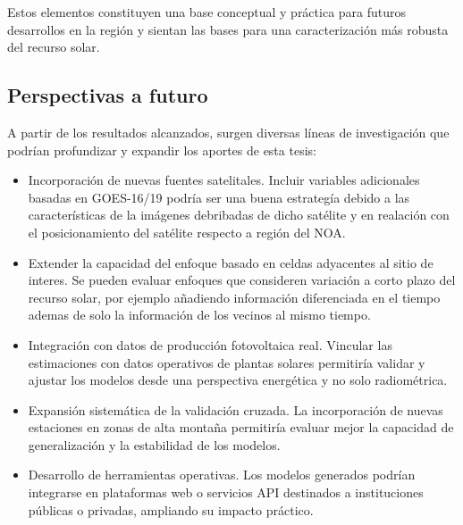 \documentclass[letterpaper,12pt, twoside]{report}
\providecommand{\DIFdeltex}[1]{{\protect\color{red} \scriptsize #1}} %
\providecommand{\DIFdel}[1]{\texorpdfstring{\DIFdeltex{#1}}{}} %
\begin{document}
\DIFdel{Estos elementos constituyen una base conceptual y práctica para futuros desarrollos en la región y sientan las bases para una caracterización más robusta del recurso solar.
}%

\subsection{\DIFdel{Perspectivas a futuro}}
\addtocounter{subsection}{-1}%

\DIFdel{A partir de los resultados alcanzados, surgen diversas líneas de investigación que podrían profundizar y expandir los aportes de esta tesis:
}%

\begin{itemize}%

\item%
\DIFdel{Incorporación de nuevas fuentes satelitales. Incluir variables adicionales basadas en  GOES-16/19 podría ser una buena estrategía debido a las características de la imágenes debribadas de dicho satélite y en realación con el posicionamiento del satélite respecto a región del NOA.
}%

\item%
\DIFdel{Extender la capacidad del enfoque basado en celdas adyacentes al sitio de interes. Se pueden evaluar enfoques que consideren variación a corto plazo del recurso solar, por ejemplo añadiendo información diferenciada en el tiempo ademas de solo la información de los vecinos al mismo tiempo.
}%

\item%
\DIFdel{Integración con datos de producción fotovoltaica real.   Vincular las estimaciones con datos operativos de plantas solares permitiría validar y ajustar los modelos desde una perspectiva energética y no solo radiométrica.
}%

\item%
\DIFdel{Expansión sistemática de la validación cruzada. La incorporación de nuevas estaciones en zonas de alta montaña permitiría evaluar mejor la capacidad de generalización y la estabilidad de los modelos.
}%

\item%
\DIFdel{Desarrollo de herramientas operativas. Los modelos generados podrían integrarse en plataformas web o servicios API destinados a instituciones públicas o privadas, ampliando su impacto práctico.
}%


\end{itemize}%
\end{document}
